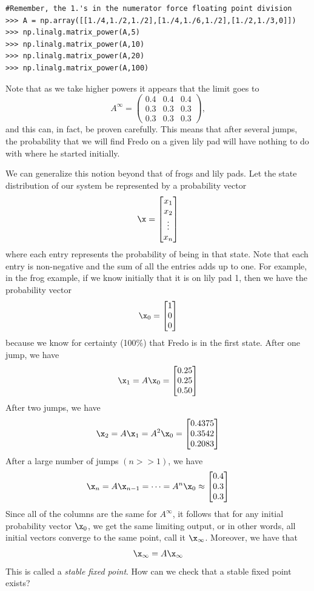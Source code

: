\begin{lstlisting}
#Remember, the 1.'s in the numerator force floating point division
>>> A = np.array([[1./4,1./2,1./2],[1./4,1./6,1./2],[1./2,1./3,0]])
>>> np.linalg.matrix_power(A,5)
>>> np.linalg.matrix_power(A,10)
>>> np.linalg.matrix_power(A,20)
>>> np.linalg.matrix_power(A,100)
\end{lstlisting}

Note that as we take higher powers it appears that the limit goes to
\[
A^\infty = \begin{pmatrix}
0.4 & 0.4 & 0.4\\
0.3 & 0.3 & 0.3\\
0.3 & 0.3 & 0.3
\end{pmatrix},
\]
and this can, in fact, be proven carefully.
This means that after several jumps, the probability that we will find Fredo on a given lily pad will have nothing to do with where he started initially.


We can generalize this notion beyond that of frogs and lily pads.
Let the state distribution of our system be represented by a probability vector
\[
\x = \begin{bmatrix}
x_1\\
x_2\\
\vdots\\
x_n
\end{bmatrix}
\]
where each entry represents the probability of being in that state.
Note that each entry is non-negative and the sum of all the entries adds up to one.
For example, in the frog example, if we know initially that it is on lily pad 1, then we have the probability vector
\[
\x_0 = \begin{bmatrix}
1\\
0\\
0
\end{bmatrix}
\]
because we know for certainty (100\%) that Fredo is in the first state.
After one jump, we have
\[
\x_1 = A \x_0 = \begin{bmatrix}
0.25\\
0.25\\
0.50
\end{bmatrix}
\]
After two jumps, we have
\[
\x_2 = A \x_1 = A^2 \x_0 = \begin{bmatrix}
0.4375\\
0.3542\\
0.2083
\end{bmatrix}
\]
After a large number of jumps $(n>>1)$, we have
\[
\x_n = A \x_{n-1} = \dots = A^n \x_0 \approx \begin{bmatrix}
0.4\\
0.3\\
0.3
\end{bmatrix}
\]
Since all of the columns are the same for $A^\infty$, it follows that for any initial probability vector $\x_0$, we get the same limiting output, or in other words, all initial vectors converge to the same point, call it $\x_\infty$.
Moreover, we have that
\[
\x_\infty = A \x_\infty
\]
This is called a \emph{stable fixed point}.
How can we check that a stable fixed point exists?

